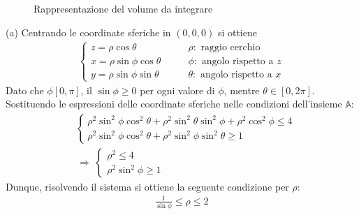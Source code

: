 \documentclass[a4paper, oneside]{book}
\begin{document}
\begin{figure}
    \centering
    \caption{Rappresentazione del volume da integrare}
\end{figure}
\noindent
(a) Centrando le coordinate sferiche in $(0, 0, 0)$ si ottiene
\begin{gather*}
    \left\{\begin{array}{l}
        z = \rho\cos\theta \\
        x = \rho\sin\phi \cos\theta \\
        y = \rho\sin\phi\sin\theta
    \end{array}\right. \qquad
    \begin{array}{l}
        \rho: \text{ raggio cerchio} \\
        \phi: \text{ angolo rispetto a } z \\
        \theta: \text{ angolo rispetto a } x
    \end{array}
\end{gather*}
Dato che $\phi[0, \pi]$, il $\sin\phi \geq 0$ per ogni valore 
di $\phi$, mentre $\theta \in [0, 2\pi]$.
Sostituendo le espressioni delle coordinate sferiche nelle condizioni dell'insieme $\mathbb{A}$:
\begin{align*}
    &\left\{\begin{array}{l}
        \rho^{2}\sin^{2}\phi \cos^{2}\theta + \rho^{2}\sin^{2}\theta\sin^{2}\phi + \rho^{2}\cos^{2}\phi \leq 4 \\
        \rho^{2}\sin^{2}\phi\cos^{2}\theta + \rho^{2}\sin^{2}\phi \sin^{2}\theta \geq 1
    \end{array}\right. \\
    &\ \Longrightarrow \ \left\{\begin{array}{l}
        \rho^{2} \leq 4 \\
        \rho^{2}\sin^{2}\phi \geq 1
    \end{array}\right.
\end{align*} 
Dunque, risolvendo il sistema si ottiene la seguente condizione per $\rho$:
\begin{gather*}
    \frac{1}{\sin\phi} \leq \rho \leq 2
\end{gather*}
\end{document}
